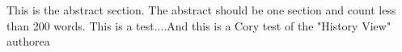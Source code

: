 This is the abstract section. The abstract should be one section and count less than 200 words. This is a test....And this is a Cory test of the "History View" authorea